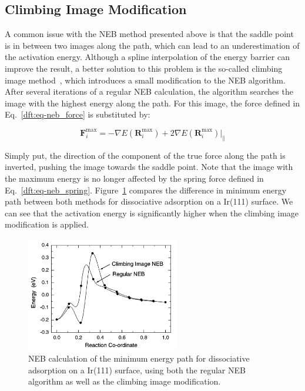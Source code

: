 \begin{refsection}
\subsection{Climbing Image Modification}

A common issue with the NEB method presented above is that the saddle point is 
in between two images along the path, which can lead to an underestimation of 
the activation energy. Although a spline interpolation of the energy barrier 
can improve the result, a better solution to this problem is the so-called 
climbing image method~\cite{Henkelman2000a}, which introduces a small 
modification to the NEB algorithm. After several iterations of a regular NEB 
calculation, the algorithm searches the image with the highest energy along 
the path. For this image, the force defined in Eq.~\ref{dft:eq-neb_force} is 
substituted by: 

\begin{equation}
\mathbf{F}_i^{\text{max}} = -\nabla E(\mathbf{R}_i^{\text{max}}) + 2\nabla 
E(\mathbf{R}_i^{\text{max}})|_\parallel 
\end{equation}

Simply put, the direction of the component of the true force along the path is 
inverted, pushing the image towards the saddle point. Note that the image with 
the maximum energy is no longer affected by the spring force defined in 
Eq.~\ref{dft:eq-neb_spring}. Figure~\ref{dft:fig-neb_climbing} compares the difference 
in minimum energy path between both methods for  dissociative 
adsorption on a Ir(111) surface. We can see that the activation energy is 
significantly higher when the climbing image modification is applied. 
 
\begin{figure}[ht] 
\centering 
\includegraphics[width=0.6\textwidth]{./figures/DFT/ci-neb.png} 
\caption{\label{dft:fig-neb_climbing} NEB calculation of the minimum energy path 
for  dissociative adsorption on a Ir(111) surface, using both the 
regular NEB algorithm as well as the climbing image 
modification.~\cite{Henkelman2000a}} 
\end{figure} 
 
\printbibliography 
\end{refsection} 
